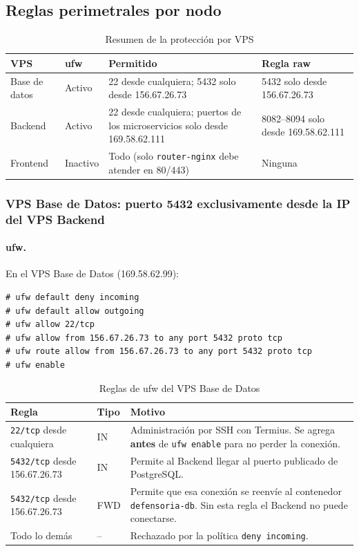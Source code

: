 \subsection{Reglas perimetrales por nodo}\label{sec:3_2_reglas_perimetrales}

\begin{table}[H]
\centering
\caption{Resumen de la protección por VPS}
\small
\begin{tabular}{p{2.3cm}p{2.3cm}p{5.2cm}p{4.6cm}}
\toprule
\textbf{VPS} & \textbf{ufw} & \textbf{Permitido} & \textbf{Regla raw} \\
\midrule
Base de datos & Activo & 22 desde cualquiera; 5432 solo desde 156.67.26.73 & 5432 solo desde 156.67.26.73 \\
Backend & Activo & 22 desde cualquiera; puertos de los microservicios solo desde 169.58.62.111 & 8082--8094 solo desde 169.58.62.111 \\
Frontend & Inactivo & Todo (solo \texttt{router-nginx} debe atender en 80/443) & Ninguna \\
\bottomrule
\end{tabular}
\end{table}

\subsubsection{VPS Base de Datos: puerto 5432 exclusivamente desde la IP del VPS Backend}
\paragraph{ufw.} En el VPS Base de Datos (169.58.62.99):
\begin{lstlisting}
# ufw default deny incoming
# ufw default allow outgoing
# ufw allow 22/tcp
# ufw allow from 156.67.26.73 to any port 5432 proto tcp
# ufw route allow from 156.67.26.73 to any port 5432 proto tcp
# ufw enable
\end{lstlisting}
\begin{table}[H]
\centering
\caption{Reglas de ufw del VPS Base de Datos}
\small
\begin{tabular}{p{5.6cm}p{2cm}p{6.8cm}}
\toprule
\textbf{Regla} & \textbf{Tipo} & \textbf{Motivo} \\
\midrule
\texttt{22/tcp} desde cualquiera & IN & Administración por SSH con Termius. Se agrega \textbf{antes} de \texttt{ufw enable} para no perder la conexión. \\
\texttt{5432/tcp} desde 156.67.26.73 & IN & Permite al Backend llegar al puerto publicado de PostgreSQL. \\
\texttt{5432/tcp} desde 156.67.26.73 & FWD & Permite que esa conexión se reenvíe al contenedor \texttt{defensoria-db}. Sin esta regla el Backend no puede conectarse. \\
Todo lo demás & -- & Rechazado por la política \texttt{deny incoming}. \\
\bottomrule
\end{tabular}
\end{table}

